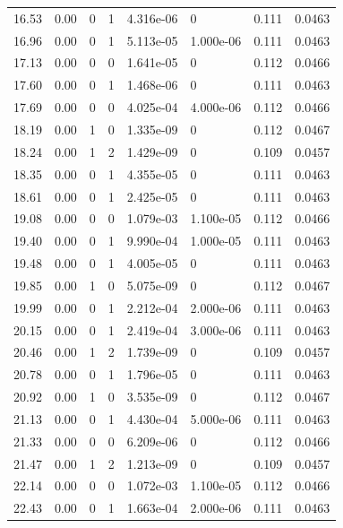 \documentclass[preview]{standalone}
\begin{document}
{{{\begin{tabular}{L{1.2cm}C{1.2cm} C{0.3cm}C{0.5cm} C{1.4cm}C{1.4cm} C{1.4cm}C{1.4cm}}
  16.53  &  0.00  & 0     &  1 &  4.316e-06  & 0  & 0.111 &  0.0463   \\ 
  16.96  &  0.00  & 0     &  1 &  5.113e-05  & 1.000e-06  & 0.111 &  0.0463   \\ 
  17.13  &  0.00  & 0     &  0 &  1.641e-05  & 0  & 0.112 &  0.0466   \\ 
  17.60  &  0.00  & 0     &  1 &  1.468e-06  & 0  & 0.111 &  0.0463   \\ 
  17.69  &  0.00  & 0     &  0 &  4.025e-04  & 4.000e-06  & 0.112 &  0.0466   \\ 
  18.19  &  0.00  & 1     &  0 &  1.335e-09  & 0  & 0.112 &  0.0467   \\ 
  18.24  &  0.00  & 1     &  2 &  1.429e-09  & 0  & 0.109 &  0.0457   \\ 
  18.35  &  0.00  & 0     &  1 &  4.355e-05  & 0  & 0.111 &  0.0463   \\ 
  18.61  &  0.00  & 0     &  1 &  2.425e-05  & 0  & 0.111 &  0.0463   \\ 
  19.08  &  0.00  & 0     &  0 &  1.079e-03  & 1.100e-05  & 0.112 &  0.0466   \\ 
  19.40  &  0.00  & 0     &  1 &  9.990e-04  & 1.000e-05  & 0.111 &  0.0463   \\ 
  19.48  &  0.00  & 0     &  1 &  4.005e-05  & 0  & 0.111 &  0.0463   \\ 
  19.85  &  0.00  & 1     &  0 &  5.075e-09  & 0  & 0.112 &  0.0467   \\ 
  19.99  &  0.00  & 0     &  1 &  2.212e-04  & 2.000e-06  & 0.111 &  0.0463   \\ 
  20.15  &  0.00  & 0     &  1 &  2.419e-04  & 3.000e-06  & 0.111 &  0.0463   \\ 
  20.46  &  0.00  & 1     &  2 &  1.739e-09  & 0  & 0.109 &  0.0457   \\ 
  20.78  &  0.00  & 0     &  1 &  1.796e-05  & 0  & 0.111 &  0.0463   \\ 
  20.92  &  0.00  & 1     &  0 &  3.535e-09  & 0  & 0.112 &  0.0467   \\ 
  21.13  &  0.00  & 0     &  1 &  4.430e-04  & 5.000e-06  & 0.111 &  0.0463   \\ 
  21.33  &  0.00  & 0     &  0 &  6.209e-06  & 0  & 0.112 &  0.0466   \\ 
  21.47  &  0.00  & 1     &  2 &  1.213e-09  & 0  & 0.109 &  0.0457   \\ 
  22.14  &  0.00  & 0     &  0 &  1.072e-03  & 1.100e-05  & 0.112 &  0.0466   \\ 
  22.43  &  0.00  & 0     &  1 &  1.663e-04  & 2.000e-06  & 0.111 &  0.0463   \\ 

\end{tabular}}}}
\end{document}
